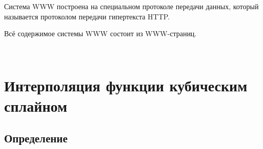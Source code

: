 \documentclass[t]{beamer}  %
\begin{document}
\begin{frame}
	\frametitle{\insertsection} 
	\framesubtitle{\insertsubsection}
	\parindent=1cm \alert{Система WWW} построена на специальном протоколе передачи данных, который называется протоколом передачи гипертекста HTTP.

\parindent=1cm Всё содержимое системы WWW состоит из WWW-страниц.
\begin{figure}
\begin{center}
\begin{minipage}[h]{0.7\linewidth}
  \\
\end{minipage}
\end{center}
\end{figure}
	
\end{frame}

\section{Интерполяция функции кубическим сплайном}
\subsection{Определение}
\end{document}
